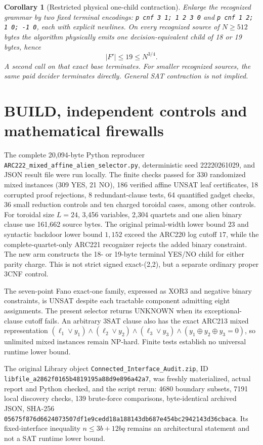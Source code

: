 \documentclass[11pt]{article}
\newtheorem{corollary}[theorem]{Corollary}
\begin{document}
\begin{corollary}[Restricted physical one-child contraction]
Enlarge the recognized grammar by two fixed terminal encodings:
\texttt{p cnf 3 1; 1 2 3 0} and
\texttt{p cnf 1 2; 1 0; -1 0}, each with explicit newlines.
On every recognized source of $N\ge512$ bytes the algorithm
physically emits one decision-equivalent child of 18 or 19 bytes,
hence
\[
 |F'|\le19\le N^{3/4}.
\]
A second call on that exact base terminates.
For smaller recognized sources, the same paid decider terminates
directly. General SAT contraction is \emph{not} implied.
\end{corollary}
\section{BUILD, independent controls and mathematical firewalls}
The complete 20,094-byte Python reproducer
\texttt{ARC222\_mixed\_affine\_alien\_selector.py}, deterministic seed
22220261029, and JSON result file were run locally. The finite
checks passed for 330 randomized mixed instances (309 YES,
21 NO), 186 verified affine UNSAT leaf certificates,
18 corrupted proof rejections, 8 redundant-clause tests,
64 quantified gadget checks, 36 small reduction controls and
ten charged toroidal cases, among other controls.
For toroidal size $L=24$, 3,456 variables, 2,304 quartets and
one alien binary clause use 161,662 source bytes.
The original primal-width lower bound $23$ and syntactic backdoor
lower bound $1,152$ exceed the ARC220 log cutoff $17$,
while the complete-quartet-only ARC221 recognizer rejects
the added binary constraint. The new arm constructs the
18- or 19-byte terminal YES/NO child for either parity charge.
This is not strict signed exact-(2,2), but a separate ordinary
proper 3CNF control.

The seven-point Fano exact-one family, expressed as XOR3 and
negative binary constraints, is UNSAT despite each tractable
component admitting eight assignments. The present selector
returns UNKNOWN when its exceptional-clause cutoff fails.
An arbitrary 3SAT clause also has the exact ARC213 mixed
representation $(\ell_1\lor y_1)\wedge(\ell_2\lor y_2)
\wedge(\ell_3\lor y_3)\wedge(y_1\oplus y_2\oplus y_3=0)$,
so unlimited mixed instances remain NP-hard. Finite tests
establish no universal runtime lower bound.

The original Library object
\texttt{Connected\_Interface\_Audit.zip}, ID
\texttt{libfile\_a2862f0165b4819195a88d9e896a42a7},
was freshly materialized, actual report and Python checked, and
the script rerun: 4680 boundary subsets, 7191 local discovery
checks, 139 brute-force comparisons, byte-identical archived JSON,
SHA-256 \texttt{05675f876d6624073507df1e9cedd18a188143db687e454bc2942143d36cbaca}.
Its fixed-interface inequality $n\le3b+12bq$ remains an
architectural statement and not a SAT runtime lower bound.
\end{document}
